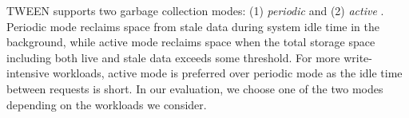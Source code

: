 TWEEN supports two garbage collection modes: (1) \textit{periodic} and (2)
\textit{active} \cite{rosenblum92}.  Periodic mode reclaims space from stale
data during system idle time in the background, while active mode reclaims
space when the total storage space including both live and stale data
exceeds some threshold.  For more write-intensive workloads, active mode is
preferred over periodic mode as the idle time between requests is short.
In our evaluation, we choose one of the two modes depending on the
workloads we consider. 








%

